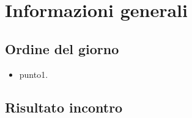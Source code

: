 \section{Informazioni generali}
    \def\modifiche { 
        {Data, YYYY-MM-DD},
        {Ora inizio, hh:mm},
        {Ora fine, hh:mm},
        {Luogo, piattaforma},
        {Presenze, \unexpanded{
            \begin{itemize}
                \item Andrea Breggion;
                \item Matteo Falsetti;
                \item Alessandro Flori;
                \item Andrea Mascari;
                \item Diego Piola;
                \item Andrea Signori;
                \item Damiano Zanardo.
            \end{itemize}}
        },
    }
    

\subsection{Ordine del giorno}
\begin{itemize}
    \item punto1.
\end{itemize}

\subsection{Risultato incontro}

